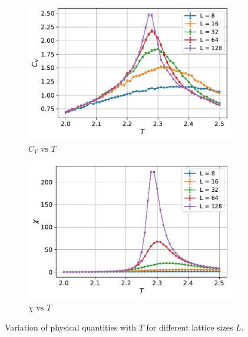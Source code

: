 \documentclass[../journal_main.tex]{subfiles}
\begin{document}
\begin{figure}[!htb]
\begin{subfigure}[b]{0.47\textwidth}
        \centering
        \includegraphics[width=\textwidth]{images/expval vs T/C_v.pdf}
        \caption{$C_V \text{ vs } T$}
    \end{subfigure}
    \hspace{1em}  %
    \begin{subfigure}[b]{0.47\textwidth}
        \centering
        \includegraphics[width=\textwidth]{images/expval vs T/chi.pdf}
        \caption{$\chi \text{ vs } T$}
    \end{subfigure}
    \caption{Variation of physical quantities with $T$ for different lattice sizes $L$.}
    \label{expvalvsT}
\end{figure}
\end{document}
